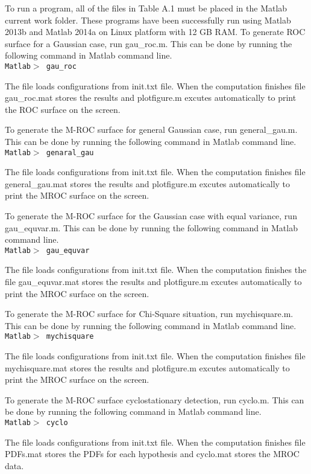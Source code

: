 To run a program, all of the files in Table A.1 must be placed in the Matlab current work folder. These programs have been successfully run using Matlab 2013b and Matlab 2014a on Linux platform with 12 GB RAM.  
To generate ROC surface for a Gaussian case, run gau\_roc.m. This can be done by running the following command in Matlab command line.
\\\texttt{Matlab$>$ gau\_roc}

The file loads configurations from init.txt file. When the computation finishes file gau\_roc.mat stores the results and plotfigure.m excutes automatically to print the ROC surface on the screen.


To generate the M-ROC surface for general Gaussian case, run general\_gau.m. This can be done by running the following command in Matlab command line.
\\\texttt{Matlab$>$ genaral\_gau}

The file loads configurations from init.txt file. When the computation finishes file general\_gau.mat stores the results and plotfigure.m excutes automatically to print the MROC surface on the screen.


To generate the M-ROC surface for the Gaussian case with equal variance, run gau\_equvar.m. This can be done by running the following command in Matlab command line.
\\\texttt{Matlab$>$ gau\_equvar}

The file loads configurations from init.txt file. When the computation finishes the file gau\_equvar.mat stores the results and plotfigure.m excutes automatically to print the MROC surface on the screen.

To generate the M-ROC surface for Chi-Square situation, run mychisquare.m. This can be done by running the following command in Matlab command line.
\\\texttt{Matlab$>$ mychisquare}

The file loads configurations from init.txt file. When the computation finishes file mychisquare.mat stores the results and plotfigure.m excutes automatically to print the MROC surface on the screen.

To generate the M-ROC surface cyclostationary detection, run cyclo.m. This can be done by running the following command in Matlab command line.
\\\texttt{Matlab$>$ cyclo}

The file loads configurations from init.txt file. When the computation finishes file PDFs.mat stores the PDFs for each hypothesis and  cyclo.mat stores the MROC data.

